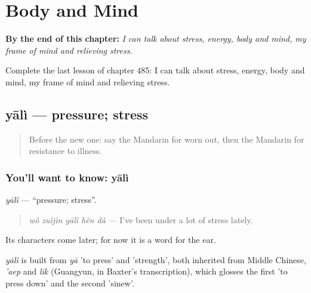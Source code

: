
\chapter{Body and Mind}
\label{ch:zh-body-and-mind}

\begin{chapteropening}
\textbf{By the end of this chapter:} \emph{I can talk about stress, energy, body and mind, my frame of mind and relieving stress.}

Complete the last lesson of chapter 485: I can talk about stress, energy, body and mind, my frame of mind and relieving stress.
\end{chapteropening}

\section[yālì]{yālì — pressure; stress}

\label{lesson:ZH-C485-yali}



\begin{quote}
Before the new one: say the Mandarin for worn out, then the Mandarin for resistance to illness.
\end{quote}

\subsection*{You'll want to know: yālì}
\emph{yālì} — \textquotedblleft{}pressure; stress\textquotedblright{}.

\begin{quote}
\emph{wǒ zuìjìn yālì hěn dà} — I've been under a lot of stress lately.
\end{quote}

Its characters come later; for now it is a word for the ear.

\begin{cousinweb}
\emph{yālì} is built from \emph{yā} 'to press' and  'strength', both inherited from Middle Chinese, \emph{'aep} and \emph{lik} (Guangyun, in Baxter's transcription), which glosses the first 'to press down' and the second 'sinew'.
\end{cousinweb}

